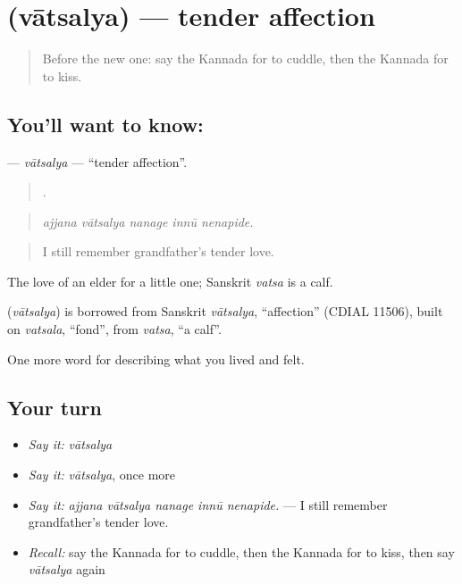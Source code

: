\section[\texorpdfstring{\kn{ವಾತ್ಸಲ್ಯ} (vātsalya)}{ವಾತ್ಸಲ್ಯ (vātsalya)}]{ (vātsalya) — tender affection}

\label{lesson:KA-C495-vatsalya}



\begin{quote}
Before the new one: say the Kannada for to cuddle, then the Kannada for to kiss.
\end{quote}

\subsection*{You'll want to know: }
\textbf{} — \emph{vātsalya} — \textquotedblleft{}tender affection\textquotedblright{}.

\begin{quote}
    .
\end{quote}

\begin{quote}
\emph{ajjana vātsalya nanage innū nenapide.}
\end{quote}

\begin{quote}
I still remember grandfather's tender love.
\end{quote}

The love of an elder for a little one; Sanskrit \emph{vatsa} is a calf.

\begin{cousinweb}
\textbf{} (\emph{vātsalya}) is borrowed from Sanskrit \emph{vātsalya}, \textquotedblleft{}affection\textquotedblright{} (CDIAL 11506), built on \emph{vatsala}, \textquotedblleft{}fond\textquotedblright{}, from \emph{vatsa}, \textquotedblleft{}a calf\textquotedblright{}.
\end{cousinweb}

\begin{grammarlens}[title={What you've built}]
One more word for describing what you lived and felt.
\end{grammarlens}

\subsection*{Your turn}
\begin{itemize}
\raggedright
  \item \emph{Say it:} \emph{vātsalya}
  \item \emph{Say it:} \emph{vātsalya}, once more
  \item \emph{Say it:} \emph{ajjana vātsalya nanage innū nenapide.} — I still remember grandfather's tender love.
  \item \emph{Recall:} say the Kannada for to cuddle, then the Kannada for to kiss, then say \emph{vātsalya} again
\end{itemize}


